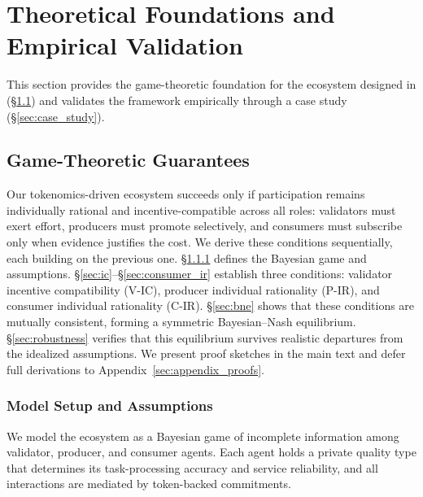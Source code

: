\section{Theoretical Foundations and Empirical Validation}

This section provides the game-theoretic foundation for the ecosystem designed in  (\S\ref{sec:game_theory}) and validates the framework empirically through a case study (\S\ref{sec:case_study}).

\subsection{Game-Theoretic Guarantees}
\label{sec:game_theory}

Our tokenomics-driven ecosystem succeeds only if participation remains individually rational and incentive-compatible across all roles: validators must exert effort, producers must promote selectively, and consumers must subscribe only when evidence justifies the cost. We derive these conditions sequentially, each building on the previous one. \S\ref{sec:setup} defines the Bayesian game and assumptions. \S\ref{sec:ic}--\S\ref{sec:consumer_ir} establish three conditions: validator incentive compatibility (V-IC), producer individual rationality (P-IR), and consumer individual rationality (C-IR). \S\ref{sec:bne} shows that these conditions are mutually consistent, forming a symmetric Bayesian--Nash equilibrium. \S\ref{sec:robustness} verifies that this equilibrium survives realistic departures from the idealized assumptions. We present proof sketches in the main text and defer full derivations to Appendix~\ref{sec:appendix_proofs}.

\subsubsection{Model Setup and Assumptions}
\label{sec:setup}

We model the ecosystem as a Bayesian game of incomplete information among validator, producer, and consumer agents. Each agent holds a private quality type that determines its task-processing accuracy and service reliability, and all interactions are mediated by token-backed commitments.

